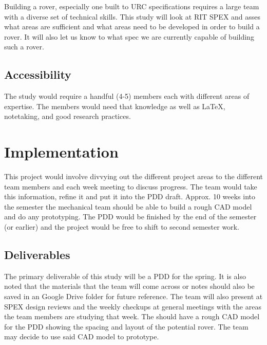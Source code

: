\documentclass[conference]{IEEEtran} %
\begin{document}
Building a rover, especially one built to URC specifications requires a large team with a diverse set of technical skills. 
This study will look at RIT SPEX and asses what areas are sufficient and what areas need to be developed in order to build a rover. 
It will also let us know to what spec we are currently capable of building such a rover. 

\subsection{Accessibility}
\label{subsec:plug-n-play}

The study would require a handful (4-5) members each with different areas of expertise. The members would need that knowledge as well as \LaTeX{}, notetaking, and good research practices.

\section{Implementation}
\label{sec:implementation}

This project would involve divvying out the different project areas to the different team members and each week meeting to discuss progress. 
The team would take this information, refine it and put it into the PDD draft. 
Approx. 10 weeks into the semester the mechanical team should be able to build a rough CAD model and do any prototyping.
The PDD would be finished by the end of the semester (or earlier) and the project would be free to shift to second semester work.    

\subsection{Deliverables}
\label{subsec:deliverables}
The primary deliverable of this study will be a PDD for the spring. It is also noted that the materials that the team will come across or notes should also be saved in an Google Drive folder for future reference.  
The team will also present at SPEX design reviews and the weekly checkups at general meetings with the areas the team members are studying that week.
The should have a rough CAD model for the PDD showing the spacing and layout of the potential rover. 
The team may decide to use said CAD model to prototype. 
\end{document}
